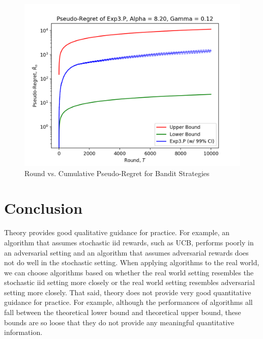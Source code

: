 \documentclass[12pt]{article}
\begin{document}
\begin{figure}[H]
\begin{center}
\begin{minipage}[h]{0.5\linewidth}
\includegraphics[width=\linewidth, height=0.75\linewidth]{exp3P-1.png}
\end{minipage}\end{center}
\captionsetup{justification=centering}
\caption{Round vs. Cumulative Pseudo-Regret for Bandit Strategies}
\label{fig:adversarial-rewards-2}
\end{figure}

\section{Conclusion}

Theory provides good qualitative guidance for practice. For example, an algorithm that assumes stochastic iid rewards, such as UCB, performs poorly in an adversarial setting and an algorithm that assumes adversarial rewards does not do well in the stochastic setting. When applying algorithms to the real world, we can choose algorithms based on whether the real world setting resembles the stochastic iid setting more closely or the real world setting resembles adversarial setting more closely. That said, theory does not provide very good quantitative guidance for practice. For example, although the performances of algorithms all fall between the theoretical lower bound and theoretical upper bound, these bounds are so loose that they do not provide any meaningful quantitative information.

\newpage
\printbibliography
\end{document}
